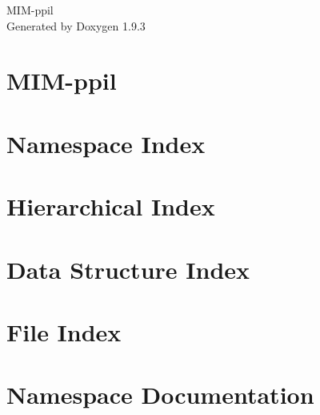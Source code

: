 \documentclass[twoside]{book}
\newcommand{\+}{\discretionary{\mbox{\scriptsize$\hookleftarrow$}}{}{}}
\newcommand{\clearemptydoublepage}{%
    \newpage{\pagestyle{empty}\cleardoublepage}%
  }
\begin{document}
  \raggedbottom
    \hypersetup{pageanchor=false,
                bookmarksnumbered=true,
                pdfencoding=unicode
               }
  \begin{titlepage}
  \vspace*{7cm}
  \begin{center}%
  {\Large MIM-\/ppil}\\
  \vspace*{1cm}
  {\large Generated by Doxygen 1.9.3}\\
  \end{center}
  \end{titlepage}
  \clearemptydoublepage
  \tableofcontents
  \clearemptydoublepage
  \hypersetup{pageanchor=true}
\chapter{MIM-\/ppil}
\label{md__r_e_a_d_m_e}

\chapter{Namespace Index}

\chapter{Hierarchical Index}

\chapter{Data Structure Index}

\chapter{File Index}

\chapter{Namespace Documentation}






\end{document}
